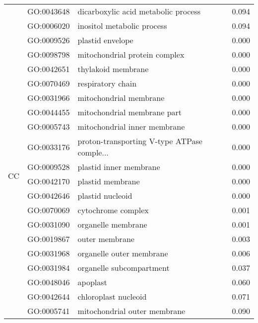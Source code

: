 \begin{longtable}{lllr}
   & GO:0043648 &          dicarboxylic acid metabolic process &         0.094 \\
   & GO:0006020 &                   inositol metabolic process &         0.094 \\
\cline{1-4}
\multirow{19}{*}{CC} & GO:0009526 &                             plastid envelope &         0.000 \\
   & GO:0098798 &                mitochondrial protein complex &         0.000 \\
   & GO:0042651 &                           thylakoid membrane &         0.000 \\
   & GO:0070469 &                            respiratory chain &         0.000 \\
   & GO:0031966 &                       mitochondrial membrane &         0.000 \\
   & GO:0044455 &                  mitochondrial membrane part &         0.000 \\
   & GO:0005743 &                 mitochondrial inner membrane &         0.000 \\
   & GO:0033176 &  proton-transporting V-type ATPase comple... &         0.000 \\
   & GO:0009528 &                       plastid inner membrane &         0.000 \\
   & GO:0042170 &                             plastid membrane &         0.000 \\
   & GO:0042646 &                             plastid nucleoid &         0.000 \\
   & GO:0070069 &                           cytochrome complex &         0.001 \\
   & GO:0031090 &                           organelle membrane &         0.001 \\
   & GO:0019867 &                               outer membrane &         0.003 \\
   & GO:0031968 &                     organelle outer membrane &         0.006 \\
   & GO:0031984 &                     organelle subcompartment &         0.037 \\
   & GO:0048046 &                                     apoplast &         0.060 \\
   & GO:0042644 &                         chloroplast nucleoid &         0.071 \\
   & GO:0005741 &                 mitochondrial outer membrane &         0.090 \\
\cline{1-4}

\end{longtable}
